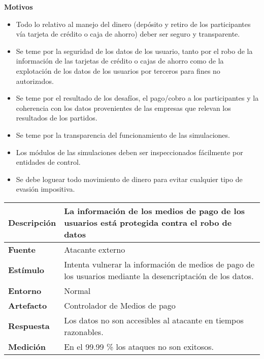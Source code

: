 \textbf{Motivos}
\begin{itemize}

\item Todo lo relativo al manejo del dinero (depósito y retiro de los participantes vía tarjeta de crédito o caja de ahorro) deber ser seguro y transparente.
\item Se teme por la seguridad de los datos de los usuario, tanto por el robo de la información de las tarjetas de crédito o cajas de ahorro como de la explotación de los datos de los usuarios por terceros para fines no autorizados.
\item Se teme por el resultado de los desafíos, el pago/cobro a los participantes y la coherencia con los datos provenientes de las empresas que relevan los resultados de los partidos.
\item Se teme por la transparencia del funcionamiento de las simulaciones. 
\item Los módulos de las simulaciones deben ser inspeccionados fácilmente por entidades de control.
\item Se debe loguear todo movimiento de dinero para evitar cualquier tipo de evasión impositiva.
\end{itemize}

\begin{center}
  \begin{tabular}{| l | p{10cm} | }
    \hline
	\textbf{Descripción} & La información de los medios de pago de los usuarios está protegida contra el robo de datos\\  \hline
	\textbf{Fuente} & Atacante externo\\  \hline
	\textbf{Estímulo} & Intenta vulnerar la información de medios de pago de los usuarios mediante la desencriptación de los datos.\\  \hline
	\textbf{Entorno} & Normal\\  \hline
	\textbf{Artefacto} & Controlador de Medios de pago\\  \hline
	\textbf{Respuesta} & Los datos no son accesibles al atacante en tiempos razonables.\\  \hline
	\textbf{Medición} & En el 99.99 \% los ataques no son exitosos.\\  \hline
  \end{tabular}
\end{center}


